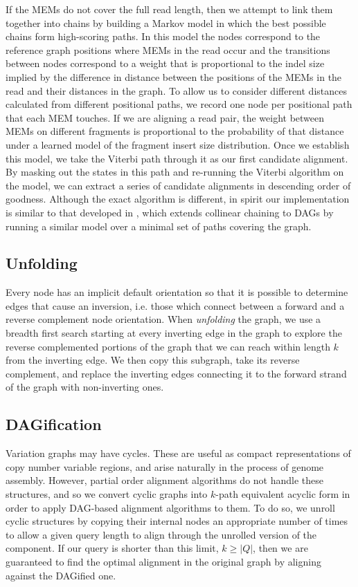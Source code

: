If the MEMs do not cover the full read length, then we attempt to link them together into chains by building a Markov model in which the best possible chains form high-scoring paths. 
In this model the nodes correspond to the reference graph positions where MEMs in the read occur and the transitions between nodes correspond to a weight that is proportional to the indel size implied by the difference in distance between the positions of the MEMs in the read and their distances in the graph. 
To allow us to consider different distances calculated from different positional paths, we record one node per positional path that each MEM touches.
If we are aligning a read pair, the weight between MEMs on different fragments is proportional to the probability of that distance under a learned model of the fragment insert size distribution. 
Once we establish this model, we take the Viterbi path through it as our first candidate alignment. 
By masking out the states in this path and re-running the Viterbi algorithm on the model, we can extract a series of candidate alignments in descending order of goodness. 
Although the exact algorithm is different, in spirit our implementation is similar to that developed in \cite{kuosmanen2018using}, which extends collinear chaining to DAGs by running a similar model over a minimal set of paths covering the graph.

\subsection{Unfolding}

Every node has an implicit default orientation so that it is possible to determine edges that cause an inversion, i.e. those which connect between a forward and a reverse complement node orientation. 
When \emph{unfolding} the graph, we use a breadth first search starting at every inverting edge in the graph to explore the reverse complemented portions of the graph that we can reach within length $k$ from the inverting edge.
We then copy this subgraph, take its reverse complement, and replace the inverting edges connecting it to the forward strand of the graph with non-inverting ones.

\subsection{DAGification}
\label{sec:DAGify}

Variation graphs may have cycles.
These are useful as compact representations of copy number variable regions, and arise naturally in the process of genome assembly.
However, partial order alignment algorithms do not handle these structures, and so we convert cyclic graphs into $k$-path equivalent acyclic form in order to apply DAG-based alignment algorithms to them.
To do so, we unroll cyclic structures by copying their internal nodes an appropriate number of times to allow a given query length to align through the unrolled version of the component.
If our query is shorter than this limit, $k \geq |Q|$, then we are guaranteed to find the optimal alignment in the original graph by aligning against the DAGified one.

